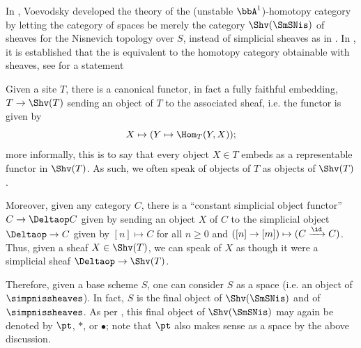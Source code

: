 \begin{remark}
    In \cite{voevodsky_A1}, Voevodsky developed the theory of the (unstable $\bbA^1$)-homotopy category by letting the category of spaces {\cite[Definition 2.2]{voevodsky_A1}} be merely the category $\Shv(\SmSNis)$ of sheaves for the Nisnevich topology over $S$, instead of simplicial sheaves as in . In \cite[Theorem 3.6]{voevodsky_A1}, it is established that the  \TODO{} is equivalent to the homotopy category obtainable with sheaves, see  for a statement
    
\end{remark}


\begin{convention} \label{convention:objects_of_a_site_as_sheaves_and_constant_simplicial_object_of_a_category}
    Given a site $T$, there is a canonical functor, in fact a fully faithful embedding, $T \to \Shv(T)$ sending an object of $T$ to the associated sheaf, i.e. the functor is given by 
    $$X \mapsto (Y \mapsto \Hom_{T}(Y, X));$$
    more informally, this is to say that every object $X \in T$ embeds as a representable functor in $\Shv(T)$. As such, we often speak of objects of $T$ as objects of $\Shv(T)$.

    Moreover, given any category $C$, there is a ``constant simplicial object functor'' $C \to \Deltaop C$ given by sending an object $X$ of $C$ to the simplicial object $\Deltaop \to C$ given by $[n] \mapsto C$ for all $n \geq 0$ and $([n] \to [m]) \mapsto (C \xrightarrow{\id} C)$. Thus, given a sheaf $X \in \Shv(T)$, we can speak of $X$ as though it were a simplicial sheaf $\Deltaop \to \Shv(T)$. 



    Therefore, given a  base scheme $S$, one can consider $S$ as a space (i.e. an object of $\simpnissheaves$). In fact, $S$ is the final object of $\Shv(\SmSNis)$ and of $\simpnissheaves$. As per , this final object of $\Shv(\SmSNis)$ may again be denoted by $\pt$, $*$, or $\bullet$; note that $\pt$ also makes sense as a space by the above discussion.  

\end{convention}

